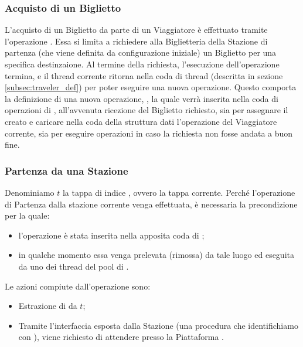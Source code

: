 	\subsubsection{Acquisto di un Biglietto}\label{subsubsec:buy_ticket}
	
	L'acquisto di un Biglietto da parte di un Viaggiatore è effettuato tramite l'operazione . Essa si limita a richiedere alla Biglietteria della Stazione di partenza (che viene definita da configurazione iniziale) un Biglietto per una specifica destinzaione. Al termine della richiesta, l'esecuzione dell'operazione termina, e il thread corrente ritorna nella coda di thread  (descritta in sezione \ref{subsec:traveler_def}) per poter eseguire una nuova operazione. Questo comporta la definizione di una nuova operazione, , la quale verrà inserita nella coda di operazioni di , all'avvenuta ricezione del Biglietto richiesto, sia per assegnare il  creato e caricare nella coda della struttura dati  l'operazione  del Viaggiatore corrente, sia per eseguire operazioni in caso la richiesta non fosse andata a buon fine.
	
	\subsubsection{Partenza da una Stazione}
	
	Denominiamo $t$ la tappa di indice , ovvero la tappa corrente. Perché l'operazione di Partenza dalla stazione corrente venga effettuata, è necessaria la precondizione per la quale:
	\begin{itemize}
		\item l'operazione  è stata inserita nella apposita coda di ;
		\item in qualche momento essa venga prelevata (rimossa) da tale luogo ed eseguita da uno dei thread del pool di . 
	\end{itemize}
Le azioni compiute dall'operazione  sono:
	
	\begin{itemize}
		\item Estrazione di  da $t$;
		\item Tramite l'interfaccia esposta dalla Stazione  (una procedura che identifichiamo con ), viene richiesto di attendere presso la Piattaforma .
	\end{itemize} 
	

